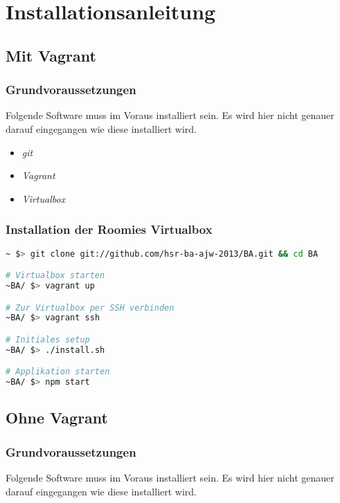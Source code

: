 \chapter{Installationsanleitung}

\section{Mit Vagrant}

\subsection*{Grundvoraussetzungen}
Folgende Software muss im Voraus installiert sein. Es wird hier nicht genauer
darauf eingegangen wie diese installiert wird.

\begin{itemize}
	\item \emph{git} \cite{git}
	\item \emph{Vagrant} \cite{Vagrant}
	\item \emph{Virtualbox} \cite{Virtualbox}
\end{itemize}

\subsection*{Installation der Roomies Virtualbox}

\begin{lstlisting}[language=Bash, caption=Installationsanleitung Vagrant]
~ $> git clone git://github.com/hsr-ba-ajw-2013/BA.git && cd BA

# Virtualbox starten
~BA/ $> vagrant up

# Zur Virtualbox per SSH verbinden
~BA/ $> vagrant ssh

# Initiales setup
~BA/ $> ./install.sh

# Applikation starten
~BA/ $> npm start
\end{lstlisting}

\section{Ohne Vagrant}

\subsection*{Grundvoraussetzungen}
Folgende Software muss im Voraus installiert sein. Es wird hier nicht genauer
darauf eingegangen wie diese installiert wird.

